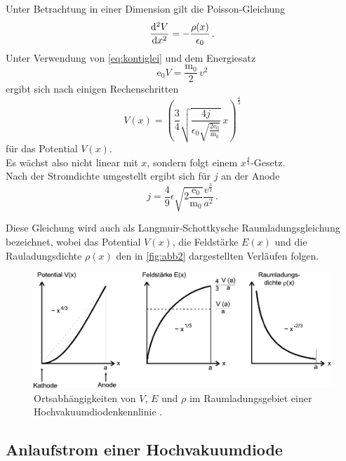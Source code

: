 Unter Betrachtung in einer Dimension gilt die Poisson-Gleichung
\begin{equation}
    \dfrac{\mathrm{d}^2 V}{\mathrm{d} x^2} = - \dfrac{\rho (x)}{\epsilon_0} \,.
\end{equation}
Unter Verwendung von \eqref{eq:kontiglei} und dem Energiesatz
\begin{equation*}
    \text{e}_0 V = \dfrac{\text{m}_0}{2} \, v^2
\end{equation*}
ergibt sich nach einigen Rechenschritten
\begin{equation*}
    V(x) = \left(\dfrac{3}{4} \sqrt{\dfrac{4j}{\epsilon_0 \sqrt{\frac{2\text{e}_0}{\text{m}_0}}}} \, x \right)^{\frac{4}{3}}
    \label{eq:potential}
\end{equation*}
für das Potential $V(x)$. \\

Es wächst also nicht linear mit $x$, sondern folgt einem $x^{\frac{4}{3}}$-Gesetz. \\

Nach der Stromdichte umgestellt ergibt sich für $j$ an der Anode
\begin{equation}
    j = \dfrac{4}{9} \epsilon \sqrt{2\frac{\text{e}_0}{\text{m}_0}} \dfrac{v^{\frac{3}{2}}}{a^2} \,.
    \label{eq:anodestromdichte}
\end{equation}

Diese Gleichung wird auch als Langmuir-Schottkysche Raumladungsgleichung bezeichnet,
wobei das Potential $V(x)$, die Feldstärke $E(x)$ und die Rauladungsdichte $\rho(x)$
den in \autoref{fig:abb2} dargestellten Verläufen folgen.

\begin{figure}[H]
    \centering
    \includegraphics{figures/Abb4.pdf}
    \caption{Ortsabhängigkeiten von $V$, $E$ und $\rho$ im Raumladungsgebiet
             einer Hochvakuumdiodenkennlinie \cite{ap09}.}
    \label{fig:abb4}
\end{figure}


\subsection{Anlaufstrom einer Hochvakuumdiode}

